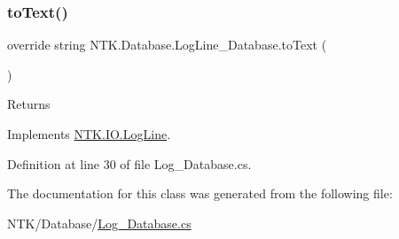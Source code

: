 \subsubsection{\texorpdfstring{toText()}{toText()}}
{\footnotesize\ttfamily override string N\+T\+K.\+Database.\+Log\+Line\+\_\+\+Database.\+to\+Text (\begin{DoxyParamCaption}{ }\end{DoxyParamCaption})\hspace{0.3cm}{\ttfamily [virtual]}}





\begin{DoxyReturn}{Returns}

\end{DoxyReturn}


Implements \mbox{\hyperlink{class_n_t_k_1_1_i_o_1_1_log_line_a0c893a688594052ad3a4f7d6181746f6}{N\+T\+K.\+I\+O.\+Log\+Line}}.



Definition at line 30 of file Log\+\_\+\+Database.\+cs.



The documentation for this class was generated from the following file\+:\begin{DoxyCompactItemize}
\item 
N\+T\+K/\+Database/\mbox{\hyperlink{_log___database_8cs}{Log\+\_\+\+Database.\+cs}}\end{DoxyCompactItemize}
